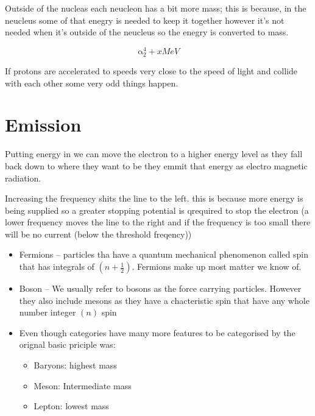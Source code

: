 \documentclass{article}
\begin{document}
Outside of the nucleas each neucleon has a bit more mass; this is because, in
the neucleus some of that enegry is needed to keep it together however it's not
needed when it's outside of the neucleus so the enegry is converted to mass.

\begin{equation}
	\mathrm{\alpha}_2^4 + x\si{MeV}
\end{equation}

If protons are accelerated to speeds very close to the speed of light and collide with
each other some very odd things happen.


\section{Emission}
Putting energy in we can move the electron to a higher energy level
as they fall back down to where they want to be they emmit that energy
as electro magnetic radiation.


\begin{center}
\end{center}

Increasing the frequency shits the line to the left. this is because more energy is being supplied so a greater
stopping potential is qrequired to stop the electron (a lower frequency moves the line to the right and
if the frequency is too small there will be no current (below the threshold freqency))

\begin{itemize}
	\item Fermions -- particles tha have a quantum mechanical phenomenon called spin that has
		integrals of $(n+\frac{1}{2})$. Fermions make up most matter we know of.

	\item Boson -- We usually refer to bosons as the force carrying particles. However they
		also include mesons as they have a chacteristic spin that have any whole number integer $(n)$
		spin

	\item Even though categories have many more features to be categorised by the orignal basic priciple was:
	\begin{itemize}
		\item Baryons: highest mass
		\item Meson: Intermediate mass
		\item Lepton: lowest mass
	\end{itemize}
\end{itemize}
\end{document}
